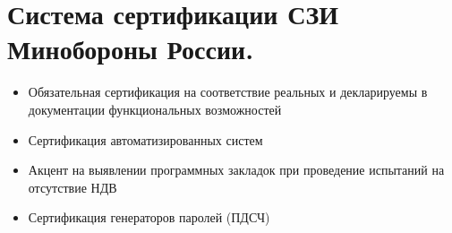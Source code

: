 \section{Система сертификации СЗИ Минобороны России.}

\begin{itemize}
	\item Обязательная сертификация на соответствие реальных и декларируемы в документации функциональных возможностей
	\item Сертификация автоматизированных систем
	\item Акцент на выявлении программных закладок при проведение испытаний на отсутствие НДВ
	\item Сертификация генераторов паролей (ПДСЧ)
\end{itemize}
